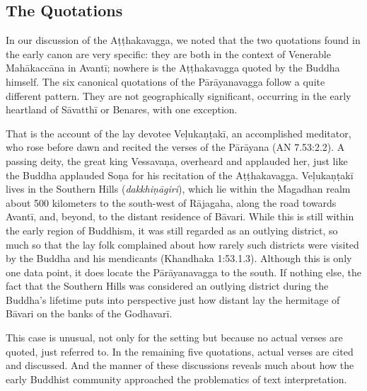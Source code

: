 \documentclass[12pt,openany]{book}%
\begin{document}
\subsection*{The Quotations}

In our discussion of the \textsanskrit{Aṭṭhakavagga}, we noted that the two quotations found in the early canon are very specific: they are both in the context of Venerable \textsanskrit{Mahākaccāna} in \textsanskrit{Avantī}; nowhere is the \textsanskrit{Aṭṭhakavagga} quoted by the Buddha himself. The six canonical quotations of the \textsanskrit{Pārāyanavagga} follow a quite different pattern. They are not geographically significant, occurring in the early heartland of \textsanskrit{Sāvatthī} or Benares, with one exception.

That is the account of the lay devotee \textsanskrit{Veḷukaṇṭakī}, an accomplished meditator, who rose before dawn and recited the verses of the \textsanskrit{Pārāyana} (AN 7.53:2.2). A passing deity, the great king \textsanskrit{Vessavaṇa}, overheard and applauded her, just like the Buddha applauded \textsanskrit{Soṇa} for his recitation of the \textsanskrit{Aṭṭhakavagga}. \textsanskrit{Veḷukaṇṭakī} lives in the Southern Hills (\textit{\textsanskrit{dakkhiṇāgiri}}), which lie within the Magadhan realm about 500 kilometers to the south-west of \textsanskrit{Rājagaha}, along the road towards \textsanskrit{Avantī}, and, beyond, to the distant residence of \textsanskrit{Bāvari}. While this is still within the early region of Buddhism, it was still regarded as an outlying district, so much so that the lay folk complained about how rarely such districts were visited by the Buddha and his mendicants (Khandhaka 1:53.1.3). Although this is only one data point, it does locate the \textsanskrit{Pārāyanavagga} to the south. If nothing else, the fact that the Southern Hills was considered an outlying district during the Buddha’s lifetime puts into perspective just how distant lay the hermitage of \textsanskrit{Bāvari} on the banks of the \textsanskrit{Godhavarī}.

This case is unusual, not only for the setting but because no actual verses are quoted, just referred to. In the remaining five quotations, actual verses are cited and discussed. And the manner of these discussions reveals much about how the early Buddhist community approached the problematics of text interpretation.
\end{document}
